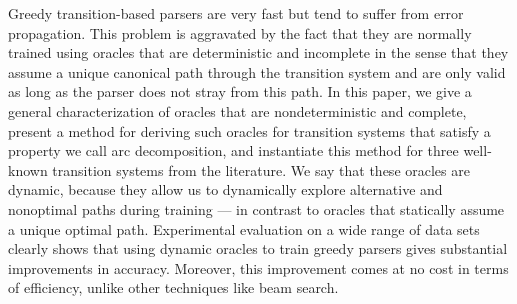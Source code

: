 Greedy transition-based parsers are very fast but tend to suffer from error propagation. This problem is aggravated by the fact that they are normally trained using oracles that are deterministic and incomplete in the sense that they assume a unique canonical path through the transition system and are only valid as long as the parser does not stray from this path. In this paper, we give a general characterization of oracles that are nondeterministic and complete, present a method for deriving such oracles for transition systems that satisfy a property we call arc decomposition, and instantiate this method for three well-known transition systems from the literature. We say that these oracles are dynamic, because they allow us to dynamically explore alternative and nonoptimal paths during training --- in contrast to oracles that statically assume a unique optimal path. Experimental evaluation on a wide range of data sets clearly shows that using dynamic oracles to train greedy parsers gives substantial improvements in accuracy. Moreover, this improvement comes at no cost in terms of efficiency, unlike other techniques like beam search.
